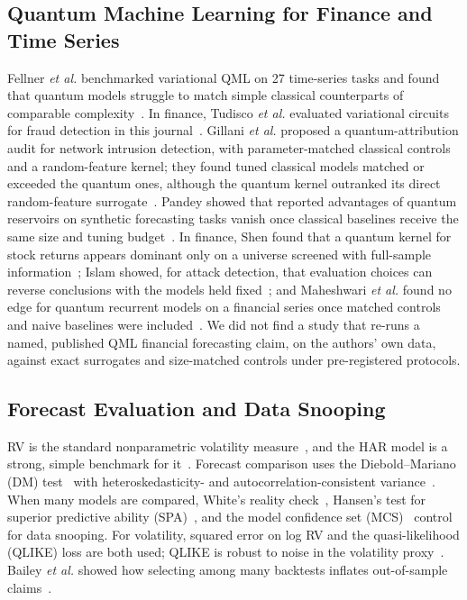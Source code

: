 \documentclass{ieeeaccess}
\begin{document}
\subsection{Quantum Machine Learning for Finance and Time Series}
Fellner \emph{et al.} benchmarked variational QML on 27 time-series tasks and found that quantum models struggle to match simple classical counterparts of comparable complexity~\cite{fellner2026}. In finance, Tudisco \emph{et al.} evaluated variational circuits for fraud detection in this journal~\cite{tudisco2024}. Gillani \emph{et al.} proposed a quantum-attribution audit for network intrusion detection, with parameter-matched classical controls and a random-feature kernel; they found tuned classical models matched or exceeded the quantum ones, although the quantum kernel outranked its direct random-feature surrogate~\cite{gillani2026}. Pandey showed that reported advantages of quantum reservoirs on synthetic forecasting tasks vanish once classical baselines receive the same size and tuning budget~\cite{pandey2026}. In finance, Shen found that a quantum kernel for stock returns appears dominant only on a universe screened with full-sample information~\cite{shen2026}; Islam showed, for attack detection, that evaluation choices can reverse conclusions with the models held fixed~\cite{islam2026}; and Maheshwari \emph{et al.} found no edge for quantum recurrent models on a financial series once matched controls and naive baselines were included~\cite{maheshwari2026}. We did not find a study that re-runs a named, published QML financial forecasting claim, on the authors' own data, against exact surrogates and size-matched controls under pre-registered protocols.

\subsection{Forecast Evaluation and Data Snooping}
RV is the standard nonparametric volatility measure~\cite{andersen2003}, and the HAR model is a strong, simple benchmark for it~\cite{corsi2009}. Forecast comparison uses the Diebold--Mariano (DM) test~\cite{diebold1995} with heteroskedasticity- and autocorrelation-consistent variance~\cite{newey1987}. When many models are compared, White's reality check~\cite{white2000}, Hansen's test for superior predictive ability (SPA)~\cite{hansen2005}, and the model confidence set (MCS)~\cite{hansen2011} control for data snooping. For volatility, squared error on log RV and the quasi-likelihood (QLIKE) loss are both used; QLIKE is robust to noise in the volatility proxy~\cite{patton2011}. Bailey \emph{et al.} showed how selecting among many backtests inflates out-of-sample claims~\cite{bailey2014}.
\end{document}
